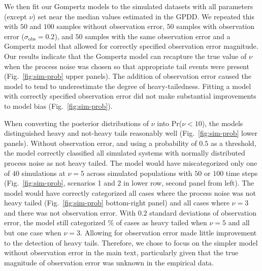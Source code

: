 We then fit our Gompertz models to the simulated datasets with all parameters
(except $\nu$) set near the median values estimated in the GPDD. We repeated
this with $50$ and $100$ samples without observation error, $50$ samples with
observation error ($\sigma_\mathrm{obs} = 0.2$), and $50$ samples with the
same observation error and a Gompertz model that allowed for correctly
specified observation error magnitude. Our results indicate that the Gompertz
model can recapture the true value of $\nu$ when the process noise was chosen
so that appropriate tail events were present (Fig.~\ref{fig:sim-prob} upper
panels). The addition of observation error caused the model to tend to
underestimate the degree of heavy-tailedness. Fitting a model with correctly
specified observation error did not make substantial improvements to model
bias (Fig.~\ref{fig:sim-prob}).


When converting the posterior distributions of $\nu$ into Pr($\nu < 10$), the
models distinguished heavy and not-heavy tails reasonably well
(Fig.~\ref{fig:sim-prob} lower panels). Without observation error, and using a
probability of $0.5$ as a threshold, the model correctly classified all
simulated systems with normally distributed process noise as not heavy tailed.
The model would have miscategorized only one of $40$ simulations at $\nu = 5$
across simulated populations with $50$ or $100$ time steps
(Fig.~\ref{fig:sim-prob}, scenarios 1 and 2 in lower row, second panel from
left). The model would have correctly categorized all cases where the process
noise was not heavy tailed (Fig.~\ref{fig:sim-prob} bottom-right panel) and
all cases where $\nu = 3$ and there was not observation error. With $0.2$
standard deviations of observation error, the model still categorized
\obsErrorNuFivePerc\% of cases as heavy tailed when $\nu = 5$ and all but one
case when $\nu = 3$. Allowing for observation error made little improvement to
the detection of heavy tails. Therefore, we chose to focus on the simpler
model without observation error in the main text, particularly given that the
true magnitude of observation error was unknown in the empirical data.

